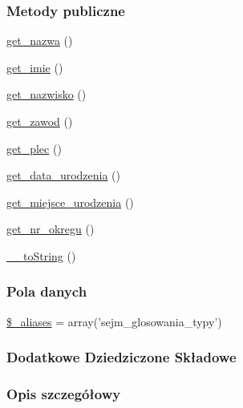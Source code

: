 \subsubsection*{Metody publiczne}
\begin{DoxyCompactItemize}
\item 
\hyperlink{classep___sejm___glosowanie___typ_ac0818f0049d7b84f08f77128f54cee36}{get\-\_\-nazwa} ()
\item 
\hyperlink{classep___sejm___glosowanie___typ_ac4b0c85dc2a130038f2d118dbd0c3d77}{get\-\_\-imie} ()
\item 
\hyperlink{classep___sejm___glosowanie___typ_abdd1d7ff92508da7f748ba1feec97af0}{get\-\_\-nazwisko} ()
\item 
\hyperlink{classep___sejm___glosowanie___typ_af80ca8310b60004454dd02a387deaa2c}{get\-\_\-zawod} ()
\item 
\hyperlink{classep___sejm___glosowanie___typ_ac7f9af5c3fa024e4c26a7b6bd4ce4bb4}{get\-\_\-plec} ()
\item 
\hyperlink{classep___sejm___glosowanie___typ_a880b240cd2d8c336fd1709bf0cb1ae2c}{get\-\_\-data\-\_\-urodzenia} ()
\item 
\hyperlink{classep___sejm___glosowanie___typ_ac57c08ec5e394a19c5bd9280c8376182}{get\-\_\-miejsce\-\_\-urodzenia} ()
\item 
\hyperlink{classep___sejm___glosowanie___typ_a2645a9f0aa5b0ccc482943348c033d0a}{get\-\_\-nr\-\_\-okregu} ()
\item 
\hyperlink{classep___sejm___glosowanie___typ_a7516ca30af0db3cdbf9a7739b48ce91d}{\-\_\-\-\_\-to\-String} ()
\end{DoxyCompactItemize}
\subsubsection*{Pola danych}
\begin{DoxyCompactItemize}
\item 
\hyperlink{classep___sejm___glosowanie___typ_ab4e31d75f0bc5d512456911e5d01366b}{\$\-\_\-aliases} = array('sejm\-\_\-glosowania\-\_\-typy')
\end{DoxyCompactItemize}
\subsubsection*{Dodatkowe Dziedziczone Składowe}


\subsubsection{Opis szczegółowy}


